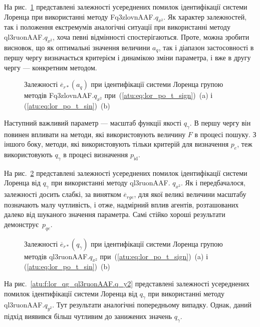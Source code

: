 На рис.~\ref{atu:f:lor_a_q_Fq3zlovnAAF.q_x2} представлені залежності усереднених
помилок ідентифікації системи Лоренца при використанні методу
Fq3zlovnAAF.$q_{x^2}$.
Як характер залежностей, так і положення екстремумів аналогічні
ситуації при використанні методу
ql3ruonAAF.$q_{x^2}$,
хоча певні відмінності спостерігаються. Проте, можна зробити
висновок, що як оптимальні значення величини
$a_q$, так і діапазон застосовності в першу чергу визначається
критерієм і динамікою зміни параметра, і вже в другу чергу ---
конкретним методом.


\begin{figure}[htb!]
  \caption{Залежності $\overline{e}_{r *} (a_q) $ при ідентифікації системи Лоренца групою методів Fq3zlovnAAF.$q_{x^2} $ при~(\ref{atu:eq:lor_po_t_sign})~(a) і (\ref{atu:eq:lor_po_t_sin})~(b)}
\label{atu:f:lor_a_q_Fq3zlovnAAF.q_x2}
\end{figure}


Наступний важливий параметр --- масштаб функції якості
$q_\gamma$. В першу чергу він повинен впливати на методи, які
використовують величину
$F$ в процесі пошуку. З іншого боку, методи, які використовують
тільки критерій для визначення
$p_e$, теж використовують
$q_\gamma$ в процесі визначення
$p_\mathrm{id}$.

На рис.~\ref{atu:f:lor_qg_ql3ruonAAF.q_x2} представлені залежності усереднених
помилок ідентифікації системи Лоренца від
$q_\gamma$ при використанні методу ql3ruonAAF.
$q_{x^2}$. Як і передбачалося, залежності досить слабкі, за винятком
$\overline{e}_{rge}$, для якої великі величини масштабу позначають малу
чутливість, і отже, надмірний вплив агентів, розташованих далеко
від шуканого значення параметра. Самі стійко хороші результати
демонструє~$p_{qe}$.

\begin{figure}[htb!]
  \caption{Залежності $\overline{e}_{r *} (q_\gamma) $ при ідентифікації системи Лоренца групою методів ql3ruonAAF.$q_{x^2} $ при~(\ref{atu:eq:lor_po_t_sign})~(a) і (\ref{atu:eq:lor_po_t_sin})~(b)}
  \label{atu:f:lor_qg_ql3ruonAAF.q_x2}
\end{figure}



На рис.~\ref{atu:f:lor_qg_ql3ruonAAF.q_y2} представлені залежності усереднених
помилок ідентифікації системи Лоренца від
$q_\gamma $ при використанні методу
ql3ruonAAF.$q_{y^2}$.
Тут результати аналогічні попередньому випадку. Однак, даний
підхід виявився більш чутливим до занижених значень $ q_\gamma $.

